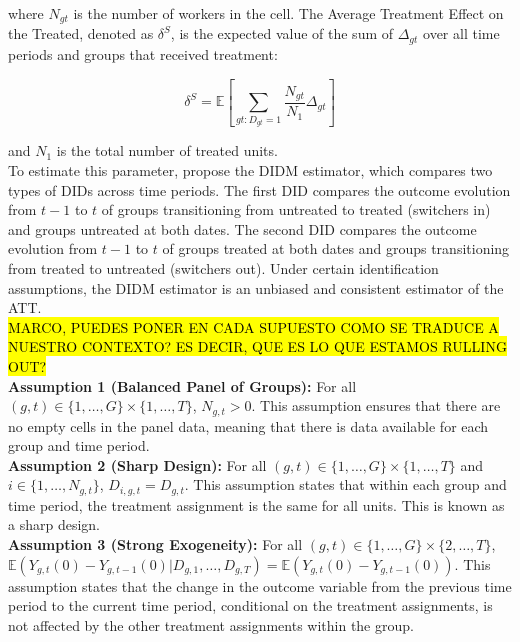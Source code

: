 \documentclass[oneside,11pt]{article}
\begin{document}
\noindent where $N_{gt}$ is the number of workers in the cell. The Average Treatment Effect on the Treated, denoted as $\delta^{S}$, is the expected value of the sum of $\Delta_{gt}$ over all time periods and groups that received treatment:

\begin{equation}
    \tag{$ATT$}
    \delta^{S} = \mathbb{E}\left[\sum_{gt:D_{gt}=1} \frac{N_{gt}}{N_1} \Delta_{gt}\right]
\end{equation}

\noindent and $N_1$ is the total number of treated units. \\

To estimate this parameter, \cite{de2020two} propose the DIDM estimator, which compares two types of DIDs across time periods. The first DID compares the outcome evolution from $t-1$ to $t$ of groups transitioning from untreated to treated (switchers in) and groups untreated at both dates. The second DID compares the outcome evolution from $t-1$ to $t$ of groups treated at both dates and groups transitioning from treated to untreated (switchers out). Under certain identification assumptions, the DIDM estimator is an unbiased and consistent estimator of the ATT. \\

\hl{MARCO, PUEDES PONER EN CADA SUPUESTO COMO SE TRADUCE A NUESTRO CONTEXTO? ES DECIR, QUE ES LO QUE ESTAMOS RULLING OUT?}
\\

\textbf{Assumption 1 (Balanced Panel of Groups):} For all $(g,t) \in \{1, \ldots, G\} \times \{1, \ldots, T\}$, $N_{g,t} > 0$. This assumption ensures that there are no empty cells in the panel data, meaning that there is data available for each group and time period. \\

\textbf{Assumption 2 (Sharp Design):} For all $(g,t) \in \{1, \ldots, G\} \times \{1, \ldots, T\}$ and $i \in \{1, \ldots, N_{g,t}\}$, $D_{i,g,t} = D_{g,t}$. This assumption states that within each group and time period, the treatment assignment is the same for all units. This is known as a sharp design. \\

\textbf{Assumption 3 (Strong Exogeneity):} For all $(g,t) \in \{1, \ldots, G\} \times \{2, \ldots, T\}$, $\mathbb{E}(Y_{g,t}(0) - Y_{g,t-1}(0) | D_{g,1}, \ldots, D_{g,T}) = \mathbb{E}(Y_{g,t}(0) - Y_{g,t-1}(0))$. This assumption states that the change in the outcome variable from the previous time period to the current time period, conditional on the treatment assignments, is not affected by the other treatment assignments within the group. \\
\end{document}
